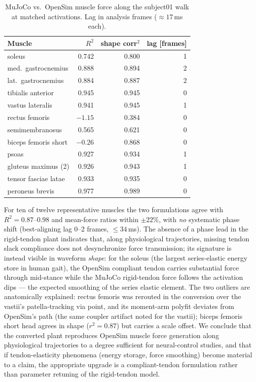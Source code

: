 \begin{table}[h]
  \centering
  \caption{MuJoCo vs.\ OpenSim muscle force along the subject01 walk at
  matched activations. Lag in analysis frames ($\approx 17$\,ms each).}
  \label{tab:force-r2}
  \small
  \begin{tabular}{lrrr}
    \toprule
    Muscle & $R^2$ & shape corr$^2$ & lag [frames] \\
    \midrule
    soleus   & 0.742 & 0.800 & 1 \\
    med.\ gastrocnemius & 0.888 & 0.894 & 2 \\
    lat.\ gastrocnemius & 0.884 & 0.887 & 2 \\
    tibialis anterior & 0.945 & 0.945 & 0 \\
    vastus lateralis & 0.941 & 0.945 & 1 \\
    rectus femoris & $-1.15$ & 0.384 & 0 \\
    semimembranosus & 0.565 & 0.621 & 0 \\
    biceps femoris short & $-0.26$ & 0.868 & 0 \\
    psoas & 0.927 & 0.934 & 1 \\
    gluteus maximus (2) & 0.926 & 0.943 & 1 \\
    tensor fasciae latae & 0.933 & 0.935 & 0 \\
    peroneus brevis & 0.977 & 0.989 & 0 \\
    \bottomrule
  \end{tabular}
\end{table}

For ten of twelve representative muscles the two formulations agree
with $R^2 = 0.87$--$0.98$ and mean-force ratios within $\pm 22\%$, with
\emph{no} systematic phase shift (best-aligning lag 0--2 frames,
$\le 34$\,ms). The absence of a phase lead in the rigid-tendon plant
indicates that, along physiological trajectories, missing tendon slack
compliance does not desynchronize force transmission; its signature is
instead visible in waveform \emph{shape}: for the soleus (the largest
series-elastic energy store in human gait), the OpenSim compliant
tendon carries substantial force through mid-stance while the MuJoCo
rigid-tendon force follows the activation dips --- the expected
smoothing of the series elastic element. The two outliers are
anatomically explained: rectus femoris was rerouted in the conversion
over the vastii's patella-tracking via point, and its moment-arm
polyfit deviates from OpenSim's path (the same coupler artifact noted
for the vastii); biceps femoris short head agrees in shape
($r^2 = 0.87$) but carries a scale offset. We conclude that the
converted plant reproduces OpenSim muscle force generation along
physiological trajectories to a degree sufficient for neural-control
studies, and that if tendon-elasticity phenomena (energy storage,
force smoothing) become material to a claim, the appropriate upgrade
is a compliant-tendon formulation rather than parameter retuning of
the rigid-tendon model.


